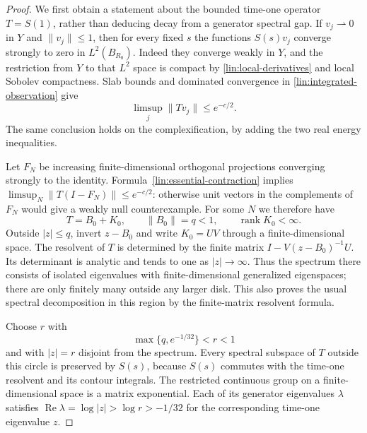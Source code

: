 \begin{proof}
We first obtain a statement about the bounded time-one operator
$T=S(1)$, rather than deducing decay from a generator spectral gap.
If $v_j\rightharpoonup0$ in $Y$ and $\|v_j\|\le1$, then for every fixed
$s$ the functions $S(s)v_j$ converge strongly to zero in
$L^2(B_{R_0})$.  Indeed they converge weakly in $Y$, and the restriction
from $Y$ to that $L^2$ space is compact by
\eqref{lin:local-derivatives} and local Sobolev compactness.  Slab bounds
and dominated convergence in \eqref{lin:integrated-observation} give
\begin{equation}\label{lin:essential-contraction}
 \limsup_j\|Tv_j\|\le e^{-c/2}.
\end{equation}
The same conclusion holds on the complexification, by adding the two
real energy inequalities.

Let $F_N$ be increasing finite-dimensional orthogonal projections
converging strongly to the identity.  Formula~\eqref{lin:essential-contraction}
implies $\limsup_N\|T(I-F_N)\|\le e^{-c/2}$: otherwise unit vectors
in the complements of $F_N$ would give a weakly null counterexample.
For some $N$ we therefore have
\[
 T=B_0+K_0,\qquad \|B_0\|=q<1,\qquad \operatorname{rank}K_0<\infty.
\]
Outside $|z|\le q$, invert $z-B_0$ and write
$K_0=UV$ through a finite-dimensional space.  The resolvent of $T$
is determined by the finite matrix
$I-V(z-B_0)^{-1}U$.  Its determinant is analytic and tends to one as
$|z|\to\infty$.  Thus the spectrum there consists of isolated
eigenvalues with finite-dimensional generalized eigenspaces; there
are only finitely many outside any larger disk.  This also proves the
usual spectral decomposition in this region by the finite-matrix
resolvent formula.

Choose $r$ with
\[
 \max\{q,e^{-1/32}\}<r<1
\]
and with $|z|=r$ disjoint from the spectrum.  Every spectral subspace
of $T$ outside this circle is preserved by $S(s)$, because $S(s)$
commutes with the time-one resolvent and its contour integrals.
The restricted continuous group on a finite-dimensional space is a
matrix exponential.  Each of its generator eigenvalues $\lambda$
satisfies $\operatorname{Re}\lambda=\log|z|>\log r>-1/32$ for the corresponding
time-one eigenvalue $z$.


\end{proof}
